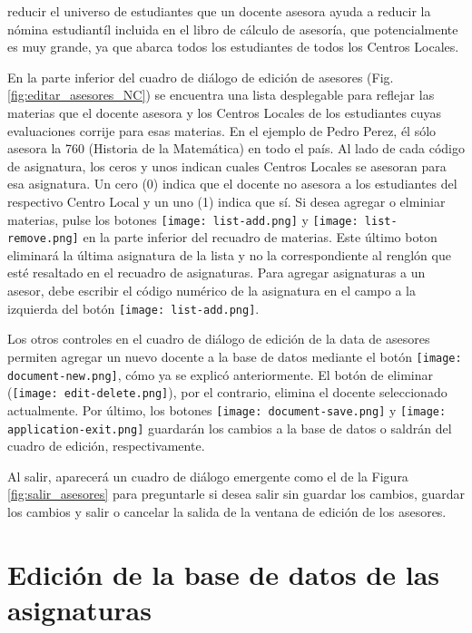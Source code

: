 \documentclass[letterpaper,12pt]{book}
\begin{document}
reducir el universo de estudiantes que un docente asesora ayuda a reducir la nómina estudiantíl incluida en el libro de cálculo de asesoría, que potencialmente es muy grande, ya que abarca todos los estudiantes de todos los Centros Locales. 

En la parte inferior del cuadro de diálogo de edición de asesores (Fig. \ref{fig:editar_asesores_NC}) se encuentra una lista desplegable para reflejar las materias que el docente asesora y los Centros Locales de los estudiantes cuyas evaluaciones corrije para esas materias. En el ejemplo de Pedro Perez, él sólo asesora la 760 (Historia de la Matemática) en todo el país. Al lado de cada código de asignatura, los ceros y unos indican cuales Centros Locales se asesoran para esa asignatura. Un cero (0) indica que el docente no asesora a los estudiantes del respectivo Centro Local y un  uno (1) indica que sí. Si desea agregar o elminiar materias, pulse los botones \texttt{[image: list-add.png]} y \texttt{[image: list-remove.png]} en la parte inferior del recuadro de materias. Este último boton eliminará la última asignatura de la lista y no la correspondiente al renglón que esté resaltado en el recuadro de asignaturas. Para agregar asignaturas a un asesor, debe escribir el código numérico de la asignatura en el campo a la izquierda del botón \texttt{[image: list-add.png]}. 

Los otros controles en el cuadro de diálogo de edición de la data de asesores permiten agregar un nuevo docente a la base de datos mediante el botón \texttt{[image: document-new.png]}, cómo ya se explicó anteriormente. El botón de eliminar (\texttt{[image: edit-delete.png]}), por el contrario, elimina el docente seleccionado actualmente. Por último, los botones \texttt{[image: document-save.png]} y \texttt{[image: application-exit.png]} guardarán los cambios a la base de datos o saldrán del cuadro de edición, respectivamente.

Al salir, aparecerá un cuadro de diálogo emergente como el de la Figura \ref{fig:salir_asesores} para preguntarle si desea salir sin guardar los cambios, guardar los cambios y salir o cancelar la salida de la ventana de edición de los asesores.

\section{Edición de la base de datos de las asignaturas}
\end{document}
